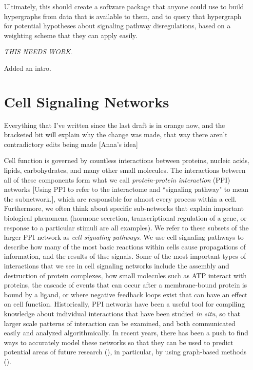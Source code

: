 \documentclass[12pt,twoside]{reedthesis}
\newcommand{\new}[2]{{\color{orange}#1 [#2]}}
\theoremstyle{definition}
\begin{document}
{ Ultimately, this should create a software package that anyone could use to build hypergraphs from data that is available to them, and to query that hypergraph for potential hypotheses about signaling pathway disregulations, based on a weighting scheme that they can apply easily.\par

 \emph{THIS NEEDS WORK.}

 }{Added an intro.}

\chapter{Cell Signaling Networks}

\new{Everything that I've written since the last draft is in orange now, and the bracketed bit will explain why the change was made, that way there aren't contradictory edits being made}{Anna's idea}

Cell function is governed by countless interactions between proteins, nucleic acids, lipids, carbohydrates, and many other small molecules.  The interactions between all of these components form what we call \new{\textit{protein-protein interaction} (PPI) networks}{Using PPI to refer to the interactome and ``signaling pathway" to mean the subnetwork.}, which are responsible for almost every process within a cell. Furthermore, we often think about specific sub-networks that explain important biological phenomena (hormone secretion, transcriptional regulation of a gene, or response to a particular stimuli are all examples). We refer to these subsets of the larger PPI network as \textit{cell signaling pathways}. We use cell signaling pathways to describe how many of the most basic reactions within cells cause propagations of information, and the results of thse signals.  Some of the most important types of interactions that we see in cell signaling networks include the assembly and destruction of protein complexes, how small molecules such as ATP interact with proteins, the cascade of events that can occur after a membrane-bound protein is bound by a ligand, or where negative feedback loops exist that can have an effect on cell function.  Historically, PPI networks have been a useful tool for compiling knowledge about individual interactions that have been studied \textit{in situ}, so that larger scale patterns of interaction can be examined, and both communicated easily and analyzed algorithmically. In recent years, there has been a push to find ways to accurately model these networks so that they can be used to predict potential areas of future research (\cite{papers}), in particular, by using graph-based methods (\cite{Aittokallio2006}).\par
\end{document}
